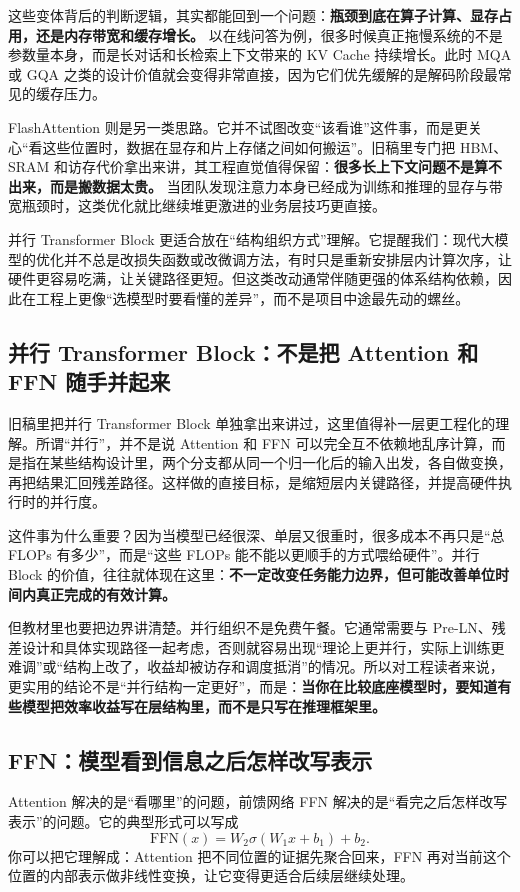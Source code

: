 这些变体背后的判断逻辑，其实都能回到一个问题：\textbf{瓶颈到底在算子计算、显存占用，还是内存带宽和缓存增长。} 以在线问答为例，很多时候真正拖慢系统的不是参数量本身，而是长对话和长检索上下文带来的 KV Cache 持续增长。此时 MQA 或 GQA 之类的设计价值就会变得非常直接，因为它们优先缓解的是解码阶段最常见的缓存压力。

FlashAttention 则是另一类思路。它并不试图改变“该看谁”这件事，而是更关心“看这些位置时，数据在显存和片上存储之间如何搬运”。旧稿里专门把 HBM、SRAM 和访存代价拿出来讲，其工程直觉值得保留：\textbf{很多长上下文问题不是算不出来，而是搬数据太贵。} 当团队发现注意力本身已经成为训练和推理的显存与带宽瓶颈时，这类优化就比继续堆更激进的业务层技巧更直接。

并行 Transformer Block 更适合放在“结构组织方式”理解。它提醒我们：现代大模型的优化并不总是改损失函数或改微调方法，有时只是重新安排层内计算次序，让硬件更容易吃满，让关键路径更短。但这类改动通常伴随更强的体系结构依赖，因此在工程上更像“选模型时要看懂的差异”，而不是项目中途最先动的螺丝。

\subsection{并行 Transformer Block：不是把 Attention 和 FFN 随手并起来}
旧稿里把并行 Transformer Block 单独拿出来讲过，这里值得补一层更工程化的理解。所谓“并行”，并不是说 Attention 和 FFN 可以完全互不依赖地乱序计算，而是指在某些结构设计里，两个分支都从同一个归一化后的输入出发，各自做变换，再把结果汇回残差路径。这样做的直接目标，是缩短层内关键路径，并提高硬件执行时的并行度。

这件事为什么重要？因为当模型已经很深、单层又很重时，很多成本不再只是“总 FLOPs 有多少”，而是“这些 FLOPs 能不能以更顺手的方式喂给硬件”。并行 Block 的价值，往往就体现在这里：\textbf{不一定改变任务能力边界，但可能改善单位时间内真正完成的有效计算。}

但教材里也要把边界讲清楚。并行组织不是免费午餐。它通常需要与 Pre-LN、残差设计和具体实现路径一起考虑，否则就容易出现“理论上更并行，实际上训练更难调”或“结构上改了，收益却被访存和调度抵消”的情况。所以对工程读者来说，更实用的结论不是“并行结构一定更好”，而是：\textbf{当你在比较底座模型时，要知道有些模型把效率收益写在层结构里，而不是只写在推理框架里。}

\subsection{FFN：模型看到信息之后怎样改写表示}
Attention 解决的是“看哪里”的问题，前馈网络 FFN 解决的是“看完之后怎样改写表示”的问题。它的典型形式可以写成
\[
\mathrm{FFN}(x)=W_2 \sigma(W_1x+b_1)+b_2.
\]
你可以把它理解成：Attention 把不同位置的证据先聚合回来，FFN 再对当前这个位置的内部表示做非线性变换，让它变得更适合后续层继续处理。

